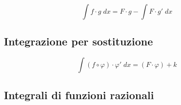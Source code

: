 \documentclass{article}
\begin{document}
\begin{equation*}
    \int{f \cdot g} \; dx = F \cdot g - \int{F \cdot g'} \; dx
\end{equation*}

\subsection{Integrazione per sostituzione}

\begin{equation*}
    \int (f \circ \varphi) \cdot \varphi' \; dx = (F \cdot \varphi) + k
\end{equation*}

\subsection{Integrali di funzioni razionali}
\end{document}
